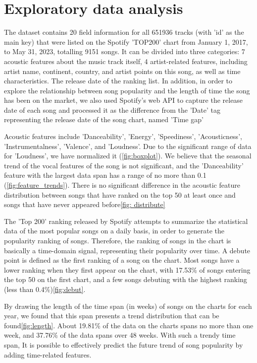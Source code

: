 \documentclass{article}
\begin{document}
\section{Exploratory data analysis}
The dataset contains 20 field information for all 651936 tracks (with 'id' as the main key) that were listed on the Spotify 'TOP200' chart from January 1, 2017, to May 31, 2023, totalling 9151 songs. It can be divided into three categories: 7 acoustic features about the music track itself, 4 artist-related features, including artist name, continent, country, and artist points on this song, as well as time characteristics. The release date of the ranking list. In addition, in order to explore the relationship between song popularity and the length of time the song has been on the market, we also used Spotify's web API to capture the release date of each song and processed it as the difference from the 'Date' tag representing the release date of the song chart, named 'Time gap'

Acoustic features include 'Danceability', 'Energy', 'Speediness', 'Acousticness', 'Instrumentalness', 'Valence', and 'Loudness'. Due to the significant range of data for 'Loudness', we have normalized it (\autoref{fig:boxplot}). We believe that the seasonal trend of the vocal features of the song is not significant, and the 'Danceability' feature with the largest data span has a range of no more than 0.1 (\autoref{fig:feature_trends}). There is no significant difference in the acoustic feature distribution between songs that have ranked on the top 50 at least once and songs that have never appeared before\autoref{fig: distribute}

The 'Top 200' ranking released by Spotify attempts to summarize the statistical data of the most popular songs on a daily basis, in order to generate the popularity ranking of songs. Therefore, the ranking of songs in the chart is basically a time-domain signal, representing their popularity over time. A debute point is defined as the first ranking of a song on the chart. Most songs have a lower ranking when they first appear on the chart, with 17.53\% of songs entering the top 50 on the first chart, and a few songs debuting with the highest ranking (less than 0.4\%)\autoref{fig:debut}.

By drawing the length of the time span (in weeks) of songs on the charts for each year, we found that this span presents a trend distribution that can be found\autoref{fig:length}. About 19.81\% of the data on the charts spans no more than one week, and 37.76\% of the data spans over 48 weeks. With such a trendy time span, It is possible to effectively predict the future trend of song popularity by adding time-related features.
\end{document}
